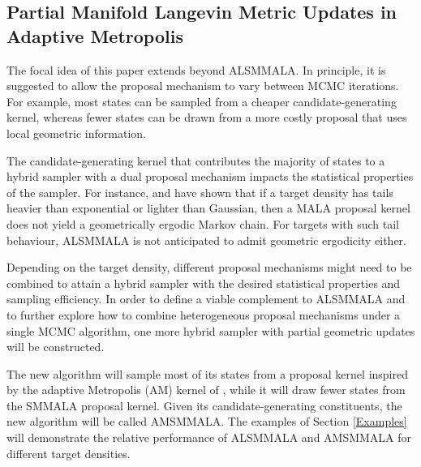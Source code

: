 \documentclass[twoside,11pt]{article}
\begin{document}
\subsection{Partial Manifold Langevin Metric Updates in Adaptive Metropolis}

The focal idea of this paper extends beyond ALSMMALA. In principle, it is suggested to allow the proposal mechanism to vary
between MCMC iterations. For example, most states can be sampled from a cheaper candidate-generating kernel, whereas fewer 
states can be drawn from a more costly proposal that uses local geometric information.

The candidate-generating kernel that contributes the majority of states to
a hybrid sampler with a dual proposal mechanism impacts the statistical properties of the sampler.
For instance, \cite{rob_twe__exp} and \cite{liv_gir__inf} have shown that if a target density has tails heavier than 
exponential or lighter than Gaussian, then a MALA proposal kernel does not yield a geometrically ergodic Markov chain. For 
targets with such tail behaviour, ALSMMALA is not anticipated to admit geometric ergodicity either.

Depending on the target density, different proposal mechanisms might need to be combined to attain a hybrid sampler with
the desired statistical properties and sampling efficiency. In order to define a viable complement to ALSMMALA
and to further explore how to combine heterogeneous proposal mechanisms under a single MCMC algorithm, one more 
hybrid sampler with partial geometric updates will be constructed.

The new algorithm will sample most of its states from a proposal kernel inspired by the adaptive Metropolis (AM) kernel of
\cite{haa_sak_tam__ana}, while it will draw fewer states from the SMMALA proposal kernel. Given its candidate-generating
constituents, the new algorithm will be called AMSMMALA. The examples of Section \ref{Examples} will demonstrate the
relative performance of ALSMMALA and AMSMMALA for different target densities.
\end{document}
